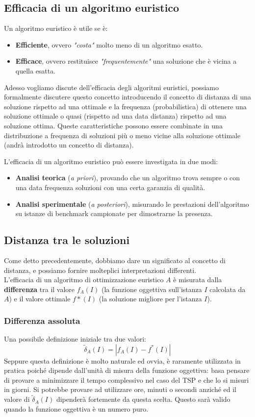 \documentclass{article}
\begin{document}
\subsection{Efficacia di un algoritmo euristico}
Un algoritmo euristico è utile se è:
\begin{itemize}
    \item \textbf{Efficiente}, ovvero \textit{"costa"} molto meno di un algoritmo esatto.
    \item \textbf{Efficace}, ovvero restituisce \textit{"frequentemente"} una soluzione
          che è vicina a quella esatta.
\end{itemize}

Adesso vogliamo discute dell'efficacia degli algoritmi euristici, possiamo formalmente discutere
questo concetto introducendo il concetto di distanza di una soluzione rispetto ad una ottimale e la
frequenza (probabilistica) di ottenere una soluzione ottimale o quasi (rispetto ad una data distanza)
rispetto ad una soluzione ottima.
Queste caratteristiche possono essere combinate in una distribuzione a frequenza di soluzioni
più o meno vicine alla soluzione ottimale (andrà introdotto un concetto di distanza).

L'efficacia di un algoritmo euristico può essere investigata in due modi:
\begin{itemize}
    \item \textbf{Analisi teorica} (\textit{a priori}), provando che un algoritmo trova
          sempre o con una data frequenza soluzioni con una certa garanzia di qualità.
    \item \textbf{Analisi sperimentale} (\textit{a posteriori}), misurando le prestazioni dell'algoritmo
          su istanze di benchmark campionate per dimostrarne la presenza.
\end{itemize}

\subsection{Distanza tra le soluzioni}
Come detto precedentemente, dobbiamo dare un significato al concetto di distanza, e possiamo fornire
molteplici interpretazioni differenti.\\L'efficacia di un algoritmo di ottimizzazione euristico $A$
è misurata dalla \textbf{differenza} tra il valore $f_A(I)$ (la funzione oggettiva sull'istanza
$I$ calcolata da $A$) e il valore ottimale $f*(I)$ (la soluzione migliore per l'istanza $I$).

\subsubsection{Differenza assoluta}
Una possibile definizione iniziale tra due valori:
$$\widetilde{\delta}_A(I)=|f_A(I)-f^{*}(I)|$$
Seppure questa definizione è molto naturale ed ovvia, è raramente utilizzata in pratica poiché dipende
dall'unità di misura della funzione oggettiva: basa pensare di provare a minimizzare il tempo complessivo
nel caso del TSP e che lo si misuri in giorni. Si potrebbe provare ad utilizzare ore, minuti o secondi
anziché ed il valore di $\widetilde{\delta}_A(I)$ dipenderà fortemente da questa scelta. Questo sarà
valido quando la funzione oggettiva è un numero puro.
\end{document}
